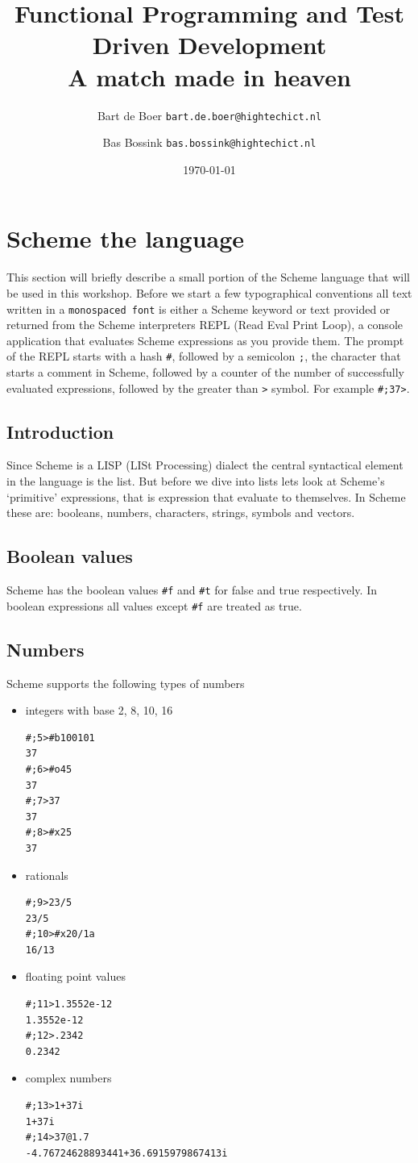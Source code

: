 \documentclass[12pt,a4paper,english,twoside]{article}
\author{
    Bart de Boer \texttt{bart.de.boer@hightechict.nl}
    \and
    Bas Bossink \texttt{bas.bossink@hightechict.nl}
}
\date{\today}
\title{Functional Programming and Test Driven Development\\
\vspace{2 mm} {\large A match made in heaven}}
\begin{document}
\maketitle
\section{Scheme the language}
This section will briefly describe a small portion of the Scheme language that 
will be used in this workshop.
Before we start a few typographical conventions all text written in a 
\texttt{monospaced font} is either a Scheme keyword or text provided or 
returned from the Scheme interpreters REPL (Read Eval Print Loop), a console 
application that evaluates Scheme expressions as you provide them. The prompt 
of the REPL starts with a hash \texttt{\#}, followed by a semicolon \texttt{;}, the 
character that starts a comment in Scheme, followed by a counter of the number 
of successfully evaluated expressions, followed by the greater than \texttt{>} 
symbol. For example \texttt{\#;37>}.
\subsection{Introduction}
Since Scheme is a LISP (LISt Processing) dialect the central syntactical 
element in the language is the list. But before we dive into lists lets look 
at Scheme's `primitive' expressions, that is expression that evaluate to 
themselves. In Scheme these are: booleans, numbers, characters, strings, 
symbols and vectors.
\subsection{Boolean values}
Scheme has the boolean values \texttt{\#f} and \texttt{\#t} for false and true 
respectively. In boolean expressions all values except \texttt{\#f} are 
treated as true.
\subsection{Numbers}
Scheme supports the following types of numbers
\begin{itemize}
\item integers with base 2, 8, 10, 16
\begin{lstlisting}
#;5>#b100101
37
#;6>#o45
37
#;7>37
37
#;8>#x25
37
\end{lstlisting}
\item rationals
\begin{lstlisting}
#;9>23/5
23/5
#;10>#x20/1a
16/13
\end{lstlisting}
\item floating point values
\begin{lstlisting}
#;11>1.3552e-12
1.3552e-12 
#;12>.2342
0.2342
\end{lstlisting}
\item complex numbers
\begin{lstlisting}
#;13>1+37i
1+37i
#;14>37@1.7
-4.76724628893441+36.6915979867413i
\end{lstlisting}
\end{itemize}
\end{document}
